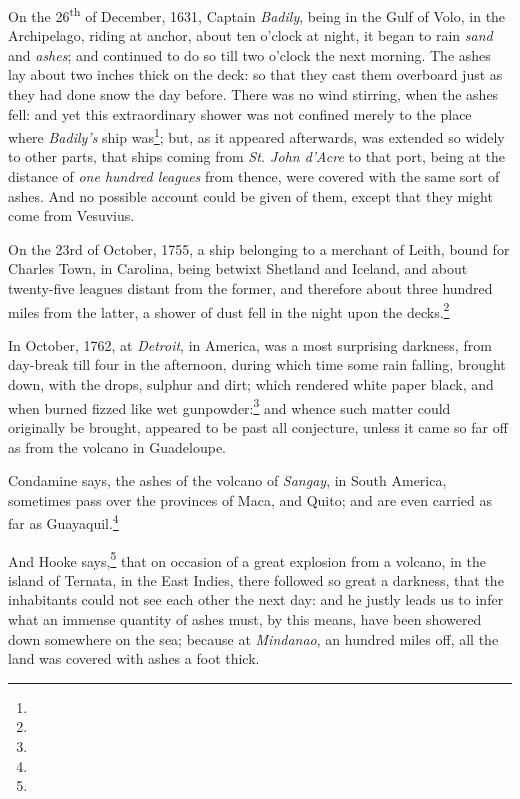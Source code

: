 \documentclass[a4paper, 12pt, oneside, twocolumn]{article}
\begin{document}
On the 26\textsuperscript{th} of December, 1631, Captain \emph{Badily}, being in the Gulf of Volo, in the Archipelago, riding at anchor, about ten o'clock at night, it began to rain \emph{sand} and \emph{ashes}; and continued to do so till two o'clock the next morning. The ashes lay about two inches thick on the deck: so that they cast them overboard just as they had done snow the day before. There was no wind stirring, when the ashes fell: and yet this extraordinary shower was not confined merely to the place where \emph{Badily's} ship was\footnote{}; but, as it appeared afterwards, was extended so widely to other parts, that ships coming from \emph{St. John d'Acre} to that port, being at the distance of \emph{one hundred leagues} from thence, were covered with the same sort of ashes. And no possible account could be given of them, except that they might come from Vesuvius.

On the 23rd of October, 1755, a ship belonging to a merchant of Leith, bound for Charles Town, in Carolina, being betwixt Shetland and Iceland, and about twenty-five leagues distant from the former, and therefore about three hundred miles from the latter, a shower of dust fell in the night upon the decks.\footnote{}

In October, 1762, at \emph{Detroit}, in America, was a most surprising darkness, from day-break till four in the afternoon, during which time some rain falling, brought down, with the drops, sulphur and dirt; which rendered white paper black, and when burned fizzed like wet gunpowder:\footnote{} and whence such matter could originally be brought, appeared to be past all conjecture, unless it came so far off as from the volcano in Guadeloupe.

Condamine says, the ashes of the volcano of \emph{Sangay}, in South America, sometimes pass over the provinces of Maca, and Quito; and are even carried as far as Guayaquil.\footnote{}

And Hooke says,\footnote{} that on occasion of a great explosion from a volcano, in the island of Ternata, in the East Indies, there followed so great a darkness, that the inhabitants could not see each other the next day: and he justly leads us to infer what an immense quantity of ashes must, by this means, have been showered down somewhere on the sea; because at \emph{Mindanao}, an hundred miles off, all the land was covered with ashes a foot thick.
\end{document}
